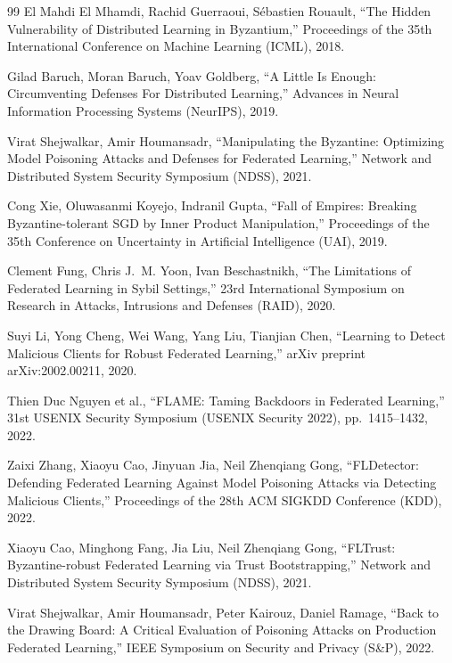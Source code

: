 \documentclass[a4j, twocolumn, dvipdfmx]{jsarticle}
\begin{document}
\begin{thebibliography}{99}
El Mahdi El Mhamdi, Rachid Guerraoui, S\'ebastien Rouault,
``The Hidden Vulnerability of Distributed Learning in Byzantium,''
Proceedings of the 35th International Conference on Machine Learning (ICML), 2018.

Gilad Baruch, Moran Baruch, Yoav Goldberg,
``A Little Is Enough: Circumventing Defenses For Distributed Learning,''
Advances in Neural Information Processing Systems (NeurIPS), 2019.

Virat Shejwalkar, Amir Houmansadr,
``Manipulating the Byzantine: Optimizing Model Poisoning Attacks and Defenses for Federated Learning,''
Network and Distributed System Security Symposium (NDSS), 2021.

Cong Xie, Oluwasanmi Koyejo, Indranil Gupta,
``Fall of Empires: Breaking Byzantine-tolerant SGD by Inner Product Manipulation,''
Proceedings of the 35th Conference on Uncertainty in Artificial Intelligence (UAI), 2019.

Clement Fung, Chris J.~M. Yoon, Ivan Beschastnikh,
``The Limitations of Federated Learning in Sybil Settings,''
23rd International Symposium on Research in Attacks, Intrusions and Defenses (RAID), 2020.

Suyi Li, Yong Cheng, Wei Wang, Yang Liu, Tianjian Chen,
``Learning to Detect Malicious Clients for Robust Federated Learning,''
arXiv preprint arXiv:2002.00211, 2020.

Thien Duc Nguyen et al.,
``FLAME: Taming Backdoors in Federated Learning,''
31st USENIX Security Symposium (USENIX Security 2022), pp.~1415--1432, 2022.

Zaixi Zhang, Xiaoyu Cao, Jinyuan Jia, Neil Zhenqiang Gong,
``FLDetector: Defending Federated Learning Against Model Poisoning Attacks via Detecting Malicious Clients,''
Proceedings of the 28th ACM SIGKDD Conference (KDD), 2022.

Xiaoyu Cao, Minghong Fang, Jia Liu, Neil Zhenqiang Gong,
``FLTrust: Byzantine-robust Federated Learning via Trust Bootstrapping,''
Network and Distributed System Security Symposium (NDSS), 2021.

Virat Shejwalkar, Amir Houmansadr, Peter Kairouz, Daniel Ramage,
``Back to the Drawing Board: A Critical Evaluation of Poisoning Attacks on Production Federated Learning,''
IEEE Symposium on Security and Privacy (S\&P), 2022.


\end{thebibliography}
\end{document}
